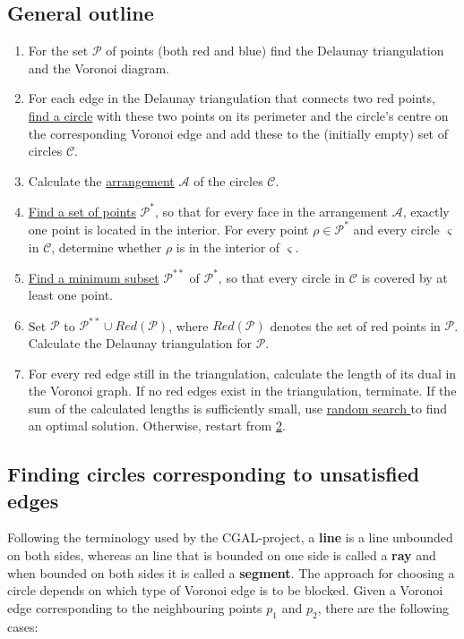 \documentclass[a4paper,12pt]{article}
\begin{document}
\subsection{General outline}
\label{ref:Algorithm}
\begin{enumerate}
\item
For the set $\mathcal P$ of points (both red and blue) find the Delaunay triangulation and the Voronoi diagram.
\item
\label{alg:part2}
For each edge in the Delaunay triangulation that connects two red points, \hyperref[sec:findCircle]{find a circle} with these two points on its perimeter and the circle's centre on the corresponding Voronoi edge and add these to the (initially empty) set of circles $\mathcal C$.
\item
Calculate the \hyperref[sec:arrangement]{arrangement} $\mathcal A$ of the circles $\mathcal C$.
\item
\hyperref[sec:findPoints]{Find a set of points} $\mathcal P^*$, so that for every face in the arrangement $\mathcal A$, exactly one point is located in the interior. For every point $\rho  \in \mathcal P^*$ and every circle $\varsigma$ in $\mathcal C$, determine whether $\rho$ is in the interior of $\varsigma$.
\item
\hyperref[sec:gurobi]{Find a minimum subset} $\mathcal P^{**}$ of $\mathcal P^*$, so that every circle in $\mathcal C$ is covered by at least one point.
\item
Set $\mathcal P$ to $\mathcal P^{**} \cup Red(\mathcal P )$, where  $Red(\mathcal P )$ denotes the set of red points in $\mathcal P$. Calculate the Delaunay triangulation for $\mathcal P$.
\item
For every red edge still in the triangulation, calculate the length of its dual in the Voronoi graph. If no red edges exist in the triangulation, terminate. If the sum of the calculated lengths is sufficiently small, use \hyperref[sec:rand]{random search } to find an optimal solution. Otherwise, restart from \hyperref[alg:part2]{2}.
\end{enumerate}

\subsection{Finding circles corresponding to unsatisfied edges}
\label{sec:findCircle}
Following the terminology used by the CGAL-project, a {\bf line} is a line unbounded on both sides, whereas an line that is bounded on one side is called a {\bf ray} and when bounded on both sides it is called a {\bf segment}. \newline 
The approach for choosing a circle depends on which type of Voronoi edge is to be blocked. Given a Voronoi edge corresponding to the neighbouring points $p_1$ and $p_2$, there are the following cases:
\end{document}
